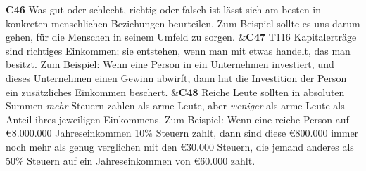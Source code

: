 \documentclass[
		11pt,
		a4paper,
		openright,
		oneside,
		ngerman
	]
	{book}
\begin{document}
\begin{longtabu}[htpb]
\midrule

\textbf{C46}
		Was gut oder schlecht, richtig oder falsch ist lässt sich am besten in konkreten menschlichen Beziehungen beurteilen.
		Zum Beispiel sollte es uns darum gehen, für die Menschen in seinem Umfeld zu sorgen.
&\textbf{C47} T116
		Kapitalerträge sind richtiges Einkommen; sie entstehen, wenn man mit etwas handelt, das man besitzt.
		Zum Beispiel: Wenn eine Person in ein Unternehmen investiert, und dieses Unternehmen einen Gewinn abwirft, dann hat die Investition der Person ein zusätzliches Einkommen beschert.
&\textbf{C48} %
		Reiche Leute sollten in absoluten Summen \emph{mehr} Steuern zahlen als arme Leute, aber \emph{weniger} als arme Leute als Anteil ihres jeweiligen Einkommens.
		Zum Beispiel: Wenn eine reiche Person auf \euro 8.000.000 Jahreseinkommen 10\% Steuern zahlt, dann sind diese \euro 800.000 immer noch mehr als genug verglichen mit den \euro 30.000 Steuern, die jemand anderes als 50\% Steuern auf ein Jahreseinkommen von \euro 60.000 zahlt.
\\

\midrule


\end{longtabu}
\end{document}
